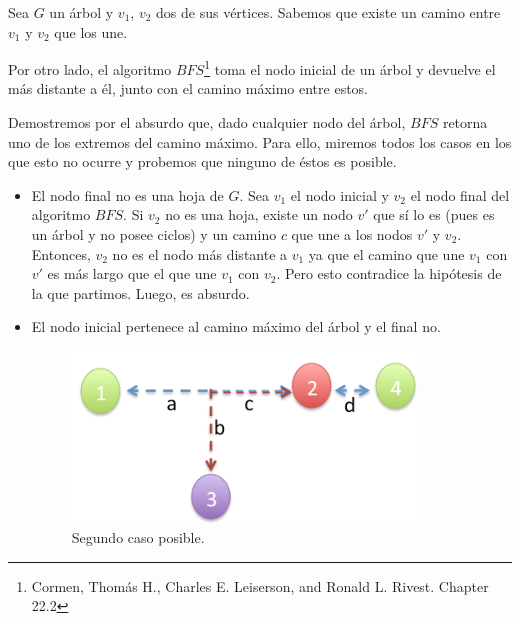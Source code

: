 \begin{itemize}
Sea $G$ un árbol y $v_{1}$, $v_{2}$ dos de sus vértices. Sabemos que existe un camino entre $v_{1}$ y $v_{2}$ que los une.

 Por otro lado, el algoritmo $BFS$\footnote{Cormen, Thomás H., Charles E. Leiserson, and Ronald L. Rivest. Chapter 22.2} toma el nodo inicial de un árbol y devuelve el más distante a él, junto con el camino máximo entre estos.\newline

Demostremos por el absurdo que, dado cualquier nodo del árbol, $BFS$ retorna uno de los extremos del camino máximo. Para ello, miremos todos los casos en los que esto no ocurre y probemos que ninguno de éstos es posible.\newline
\begin {itemize}
\item El nodo final no es una hoja de $G$. \newline
Sea $v_{1}$ el nodo inicial y $v_{2}$ el nodo final del algoritmo $BFS$. Si $v_{2}$ no es una hoja, existe un nodo $v'$ que sí lo es (pues es un árbol y no posee ciclos) y un camino $c$ que une a los nodos $v'$ y $v_{2}$. Entonces, $v_{2}$ no es el nodo más distante a $v_{1}$ ya que el camino que une $v_{1}$ con $v'$ es más largo que el que une $v_{1}$ con $v_{2}$. Pero esto contradice la hipótesis de la que partimos. Luego, es absurdo.\newline  
\item El nodo inicial pertenece al camino máximo del árbol y el final no.

\begin{figure}[H] %
\begin{minipage}[H]{260pt}
\includegraphics[width=260pt]{../imgs/ej2casos02.jpg}
\end{minipage}
\hfill
\caption{Segundo caso posible.}
\end{figure}


\end{itemize}
\end{itemize}
